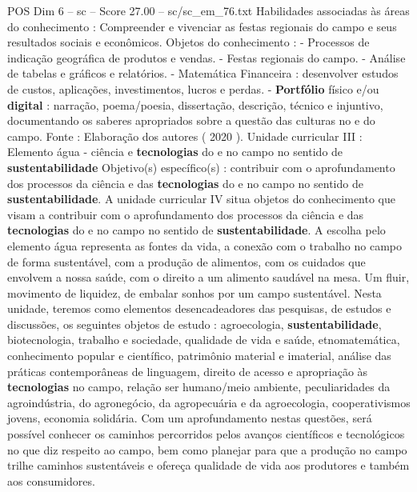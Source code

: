 \begin{textsample}{POS Dim 6 – sc – Score 27.00 – sc/sc\_em\_76.txt}
Habilidades associadas às áreas do conhecimento : Compreender e vivenciar as festas regionais do campo e seus resultados sociais e econômicos.
Objetos do conhecimento : - Processos de indicação geográfica de produtos e vendas. - Festas regionais do campo. - Análise de tabelas e gráficos e relatórios. - Matemática Financeira : desenvolver estudos de custos, aplicações, investimentos, lucros e perdas. - \textbf{Portfólio} físico e/ou \textbf{digital} : narração, poema/poesia, dissertação, descrição, técnico e injuntivo, documentando os saberes apropriados sobre a questão das culturas no e do campo.
Fonte : Elaboração dos autores ( 2020 ).
Unidade curricular III : Elemento água - ciência e \textbf{tecnologias} do e no campo no sentido de \textbf{sustentabilidade} Objetivo(s) específico(s) : contribuir com o aprofundamento dos processos da ciência e das \textbf{tecnologias} do e no campo no sentido de \textbf{sustentabilidade}.
A unidade curricular IV situa objetos do conhecimento que visam a contribuir com o aprofundamento dos processos da ciência e das \textbf{tecnologias} do e no campo no sentido de \textbf{sustentabilidade}.
A escolha pelo elemento água representa as fontes da vida, a conexão com o trabalho no campo de forma sustentável, com a produção de alimentos, com os cuidados que envolvem a nossa saúde, com o direito a um alimento saudável na mesa.
Um fluir, movimento de liquidez, de embalar sonhos por um campo sustentável.
Nesta unidade, teremos como elementos desencadeadores das pesquisas, de estudos e discussões, os seguintes objetos de estudo : agroecologia, \textbf{sustentabilidade}, biotecnologia, trabalho e sociedade, qualidade de vida e saúde, etnomatemática, conhecimento popular e científico, patrimônio material e imaterial, análise das práticas contemporâneas de linguagem, direito de acesso e apropriação às \textbf{tecnologias} no campo, relação ser humano/meio ambiente, peculiaridades da agroindústria, do agronegócio, da agropecuária e da agroecologia, cooperativismos jovens, economia solidária.
Com um aprofundamento nestas questões, será possível conhecer os caminhos percorridos pelos avanços científicos e tecnológicos no que diz respeito ao campo, bem como planejar para que a produção no campo trilhe caminhos sustentáveis e ofereça qualidade de vida aos produtores e também aos consumidores.

\end{textsample}
